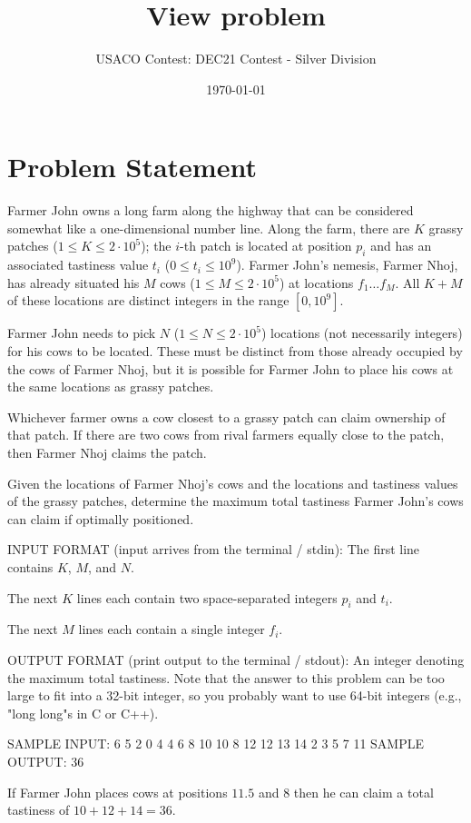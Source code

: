 \documentclass[12pt]{article}
\title{View problem}
\author{USACO Contest: DEC21 Contest - Silver Division}
\date{\today}
\begin{document}
\maketitle

\section*{Problem Statement}

Farmer John owns a long farm along the highway that can be considered somewhat
like a one-dimensional number line.  Along the farm, there are $K$ grassy 
patches ($1 \leq K \leq 2\cdot 10^5$); the $i$-th patch is located at position
$p_i$ and  has an associated tastiness  value $t_i$ ($0\le t_i\le 10^9$). 
Farmer John's nemesis, Farmer Nhoj, has  already situated his $M$ cows
($1 \leq M \leq 2\cdot 10^5$) at locations $f_1 \ldots f_M$. All $K+M$ of these
locations are distinct integers in the range $[0,10^9]$.

Farmer John needs to pick $N$ ($1\le N\le 2\cdot 10^5$) locations (not
necessarily integers) for his cows to be located.  These must be distinct from
those already occupied by the cows of Farmer Nhoj, but it is possible for 
Farmer John to place his cows at the same locations as grassy patches.

Whichever farmer owns a cow closest to a grassy patch can claim ownership of
that patch.  If there are two cows from rival farmers equally close to the
patch, then Farmer Nhoj claims the patch. 

Given the locations of Farmer Nhoj's cows and the locations and tastiness values
of the grassy patches, determine the maximum total tastiness Farmer John's cows
can claim if optimally positioned. 

INPUT FORMAT (input arrives from the terminal / stdin):
The first line contains $K$, $M$, and $N$.

The next $K$ lines each contain two space-separated integers $p_i$ and $t_i$.

The next $M$ lines each contain a single integer $f_i$.

OUTPUT FORMAT (print output to the terminal / stdout):
An integer denoting the maximum total tastiness. Note that the answer to this
problem can be too large to fit into a 32-bit integer, so you probably want to
use 64-bit integers (e.g., "long long"s in C or C++).

SAMPLE INPUT:
6 5 2
0 4
4 6
8 10
10 8
12 12
13 14
2
3
5
7
11
SAMPLE OUTPUT: 
36

If Farmer John places cows at positions $11.5$ and $8$ then he can claim a total tastiness
of
$10+12+14=36$.
\end{document}
